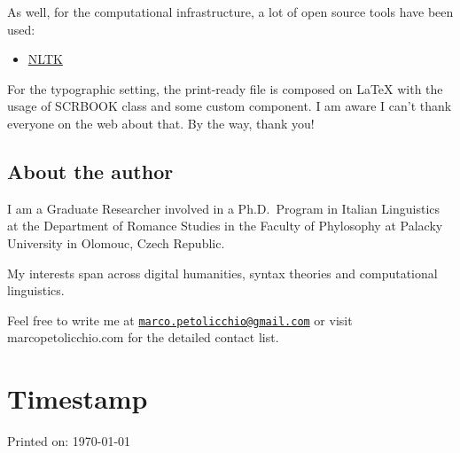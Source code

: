 \documentclass[a4paper,twoside,11pt,chapterprefix=true,listof=totocnumbered,bibliography=totocnumbered]{scrbook}
\providecommand{\tightlist}{%
  \setlength{\itemsep}{0pt}\setlength{\parskip}{0pt}}
\theoremstyle{definition}
\theoremstyle{definition}
\theoremstyle{definition}
\theoremstyle{remark}
\begin{document}
As well, for the computational infrastructure, a lot of open source
tools have been used:

\begin{itemize}
\tightlist
\item
  \href{https://bookdown.org}{NLTK}
\end{itemize}

For the typographic setting, the print-ready file is composed on LaTeX
with the usage of SCRBOOK class and some custom component. I am aware I
can't thank everyone on the web about that. By the way, thank you!

\section{About the author}\label{about-the-author}

I am a Graduate Researcher involved in a Ph.D.~Program in Italian
Linguistics at the Department of Romance Studies in the Faculty of
Phylosophy at Palacky University in Olomouc, Czech Republic.

My interests span across digital humanities, syntax theories and
computational linguistics.

Feel free to write me at
\href{mailto:marco.petolicchio@gmail.com}{\nolinkurl{marco.petolicchio@gmail.com}}
or visit marcopetolicchio.com for the detailed contact list.



\listoftables
\listoffigures


\clearpage
\chapter*{Timestamp}
\vfill
\begin{center}

Printed on: \today

\end{center}
\end{document}
